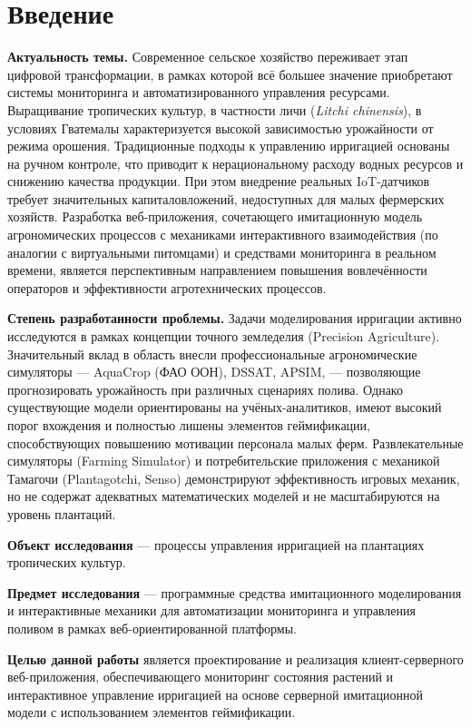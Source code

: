 \section*{Введение}

\textbf{Актуальность темы.} Современное сельское хозяйство переживает этап
цифровой трансформации, в рамках которой всё большее значение приобретают
системы мониторинга и автоматизированного управления ресурсами.
Выращивание тропических культур, в частности личи (\textit{Litchi chinensis}),
в условиях Гватемалы характеризуется высокой зависимостью урожайности от
режима орошения. Традиционные подходы к управлению ирригацией основаны на
ручном контроле, что приводит к нерациональному расходу водных ресурсов
и снижению качества продукции. При этом внедрение реальных IoT-датчиков
требует значительных капиталовложений, недоступных для малых фермерских
хозяйств. Разработка веб-приложения, сочетающего имитационную модель
агрономических процессов с механиками интерактивного взаимодействия
(по аналогии с виртуальными питомцами) и средствами мониторинга
в реальном времени, является перспективным направлением повышения
вовлечённости операторов и эффективности агротехнических процессов.

\textbf{Степень разработанности проблемы.} Задачи моделирования ирригации
активно исследуются в рамках концепции точного земледелия (Precision
Agriculture). Значительный вклад в область внесли профессиональные
агрономические симуляторы --- AquaCrop (ФАО ООН), DSSAT, APSIM, ---
позволяющие прогнозировать урожайность при различных сценариях полива.
Однако существующие модели ориентированы на учёных-аналитиков, имеют
высокий порог вхождения и полностью лишены элементов геймификации,
способствующих повышению мотивации персонала малых ферм. Развлекательные
симуляторы (Farming Simulator) и потребительские приложения с механикой
Тамагочи (Plantagotchi, Senso) демонстрируют эффективность игровых
механик, но не содержат адекватных математических моделей и не
масштабируются на уровень плантаций.

\textbf{Объект исследования} — процессы управления ирригацией
на плантациях тропических культур.

\textbf{Предмет исследования} — программные средства имитационного
моделирования и интерактивные механики для автоматизации мониторинга
и управления поливом в рамках веб-ориентированной платформы.

\textbf{Целью данной работы} является проектирование и реализация
клиент-серверного веб-приложения, обеспечивающего мониторинг
состояния растений и интерактивное управление ирригацией
на основе серверной имитационной модели с использованием
элементов геймификации.